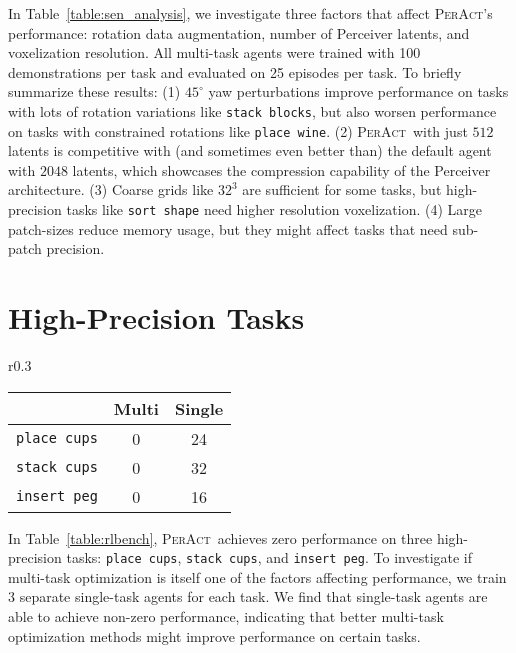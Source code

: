 \documentclass{article}
\newcommand{\tabref}[1]{Table~\ref{#1}}
\newcommand{\model}{\textsc{PerAct}}
\begin{document}
In \tabref{table:sen_analysis}, we investigate three factors that affect \model's performance: rotation data augmentation, number of Perceiver latents, and voxelization resolution. All multi-task agents were trained with 100 demonstrations per task and evaluated on 25 episodes per task. To briefly summarize these results: (1) $45^{\circ}$ yaw perturbations improve performance on tasks with lots of rotation variations like \texttt{stack blocks}, but also worsen performance on tasks with constrained rotations like \texttt{place wine}. (2) \model~with just $512$ latents is competitive with (and sometimes even better than) the default agent with $2048$ latents, which showcases the compression capability of the Perceiver architecture. (3) Coarse grids like $32^3$ are sufficient for some tasks, but  high-precision tasks like \texttt{sort shape} need higher resolution voxelization. (4) Large patch-sizes reduce memory usage, but they might affect tasks that need sub-patch precision. 




\section{High-Precision Tasks}
\label{app:high_pres}

\begin{wraptable}{r}{0.3\textwidth}
\vspace{-0.89cm}
\centering
\scriptsize
\begin{tabular}{lcc} 
\toprule
              & Multi & Single  \\ 
\midrule
\texttt{place cups}    & 0     & 24     \\
\texttt{stack cups}    & 0     & 32      \\
\texttt{insert peg} & 0     & 16      \\
\bottomrule
\end{tabular}
\label{table:high_pres_res}
\caption{\scriptsize{Success rates (mean \%) of multi-task and single-task \model~agents trained with 100 demos and evaluated on 25 episodes.}}
\end{wraptable}
 In \tabref{table:rlbench}, \model~achieves zero performance on three high-precision tasks: \texttt{place cups}, \texttt{stack cups}, and \texttt{insert peg}. To investigate if multi-task optimization is itself one of the factors affecting performance, we train 3 separate single-task agents for each task. We find that single-task agents are able to achieve non-zero performance, indicating that better multi-task optimization methods might  improve performance on certain tasks. 
\end{document}
